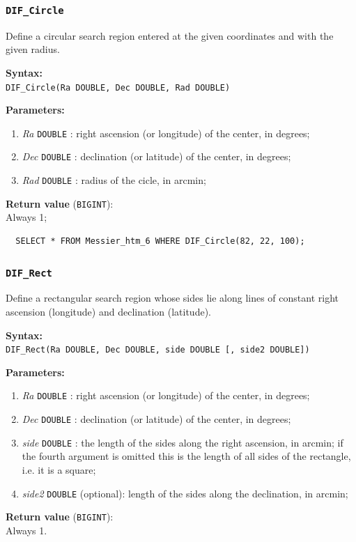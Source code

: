 \documentclass[10pt,titlepage]{article}
\newcommand{\syntax}[1]
{
  \bigskip
  \noindent
  \textbf{Syntax:} \\ 
  \indent \texttt{#1}
}
\newenvironment{parameters}
{
  \medskip
  \noindent
  \textbf{Parameters:}
  \begin{enumerate}
}
{
  \end{enumerate}
}
\newcommand{\param}[2]
{
  \item \textit{#1} \texttt{#2} 
}
\newcommand{\return}[1]
{
  \medskip
  \noindent
  \textbf{Return value} (\texttt{#1}): \\
  \indent
}
\newcommand{\example}
{
\medskip
\noindent{\textbf{Example:}}
}
\begin{document}
\subsubsection{{\tt DIF\_Circle}}
Define a circular search region entered at the given coordinates and with the
given radius. 

\syntax{DIF\_Circle(Ra DOUBLE, Dec DOUBLE, Rad DOUBLE)}

\begin{parameters}
  \param{Ra}{DOUBLE}: right ascension (or longitude) of the
  center, in degrees;
  \param{Dec}{DOUBLE}: declination (or latitude) of the center,
  in degrees;
  \param{Rad}{DOUBLE}: radius of the cicle, in arcmin;
\end{parameters}

\return{BIGINT} Always 1;

\example
%
\begin{verbatim}
  SELECT * FROM Messier_htm_6 WHERE DIF_Circle(82, 22, 100);
\end{verbatim}




\subsubsection{{\tt DIF\_Rect}}
Define a rectangular search region whose sides lie along lines of
constant right ascension (longitude) and declination (latitude).

\syntax{DIF\_Rect(Ra DOUBLE, Dec DOUBLE, side DOUBLE [, side2 DOUBLE])}

\begin{parameters}
  \param{Ra}{DOUBLE}: right ascension (or longitude) of the
  center, in degrees;
  \param{Dec}{DOUBLE}: declination (or latitude) of the center,
  in degrees;
  \param{side}{DOUBLE}: the length of the sides along the right ascension,
  in arcmin;
  if the fourth argument is omitted this is the length of all sides of
  the rectangle, i.e. it is a square;
  \param{side2}{DOUBLE} (optional): length of the sides along
  the declination, in arcmin;
\end{parameters}

\return{BIGINT} Always 1.
\end{document}
